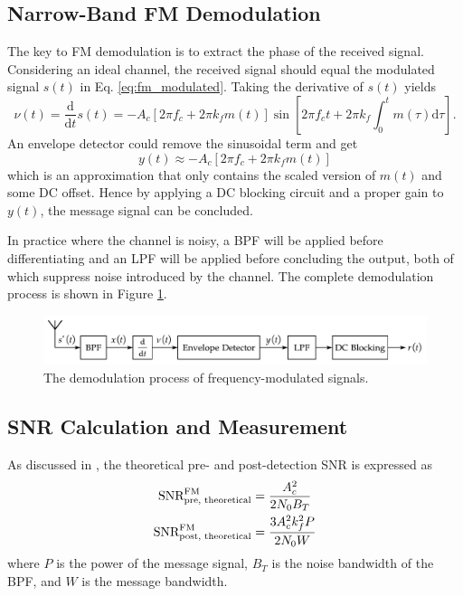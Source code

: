 \documentclass[../ECE459FinalProjectReport.tex]{subfiles}
\begin{document}
\subsection{Narrow-Band FM Demodulation}
The key to FM demodulation is to extract the phase of the received signal. Considering an ideal channel, the received signal should equal the modulated signal $s(t)$ in Eq. \eqref{eq:fm_modulated}. Taking the derivative of $s(t)$ yields
\begin{equation}
    \nu \left( t \right) =\frac{\mathrm{d}}{\mathrm{d}t}s\left( t \right) =-A_c\left[ 2\pi f_c+2\pi k_fm\left( t \right) \right] \sin \left[ 2\pi f_ct+2\pi k_f\int_0^t{m\left( \tau \right) \mathrm{d}\tau} \right].
\end{equation}
An envelope detector could remove the sinusoidal term and get
\begin{equation}
    y\left( t \right) \approx -A_c\left[ 2\pi f_c+2\pi k_fm\left( t \right) \right]
\end{equation}
which is an approximation that only contains the scaled version of $m(t)$ and some DC offset. Hence by applying a DC blocking circuit and a proper gain to $y(t)$, the message signal can be concluded.

In practice where the channel is noisy, a BPF will be applied before differentiating and an LPF will be applied before concluding the output, both of which suppress noise introduced by the channel. The complete demodulation process is shown in Figure \ref{fig:fm-demod}.
\begin{figure}[tb]
    \centering
    \includegraphics[scale=0.7]{plots/fm_demod.pdf}
    \caption{The demodulation process of frequency-modulated signals.}
    \label{fig:fm-demod}
\end{figure}

\subsection{SNR Calculation and Measurement}
As discussed in \cite[Sec. 9.7]{haykinIntroductionAnalogDigital2007}, the theoretical pre- and post-detection SNR is expressed as
\begin{align}
    \text{SNR}_{\text{pre, theoretical}}^{\text{FM}} &= \frac{A_c^2}{2N_0B_T}\\
    \text{SNR}_{\text{post, theoretical}}^{\text{FM}} &= \frac{3A_c^2 k_f^2 P}{2N_0 W}
\end{align}
where $P$ is the power of the message signal, $B_T$ is the noise bandwidth of the BPF, and $W$ is the message bandwidth. %
\end{document}
